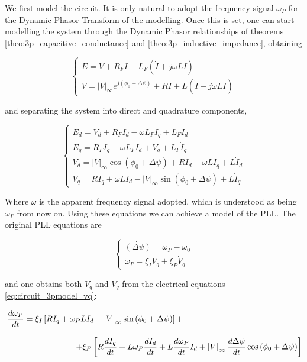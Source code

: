 \begin{example}
	We first model the circuit.  It is only natural to adopt the frequency signal $\omega_P$ for the Dynamic Phasor Transform of the modelling. Once this is set, one can start modelling the system through the Dynamic Phasor relationships of theorems \ref{theo:3p_capacitive_conductance} and \ref{theo:3p_inductive_impedance}, obtaining

\begin{equation} \left\{\begin{array}{l} E = V + R_F I + L_F\left(\dot{I} + j\omega L I\right) \\[3mm] V = \left|V\right|_\infty e^{j\left(\phi_0 + \Delta\psi\right)} + RI + L\left(\dot{I} + j\omega L I\right) \end{array}\right. \label{eq:circuit_3pmodel_complex} \end{equation}

	\noindent and separating the system into direct and quadrature components,

\begin{equation} \left\{\begin{array}{l}E_d = V_d + R_FI_d - \omega L_FI_q + L_F \dot{I}_d\\[2mm] E_q = R_FI_q + \omega L_FI_d + V_q + L_F \dot{I}_q\\[2mm] V_d = \left|V\right|_\infty\cos\left(\phi_0 + \Delta\psi\right) + RI_d - \omega L I_q + L \dot{I}_d \\[2mm] V_q = RI_q + \omega LI_d - \left|V\right|_\infty\sin\left(\phi_0 + \Delta\psi\right) +  L \dot{I}_q\end{array}\right. \label{eq:circuit_3pmodel_vq} \end{equation}

	Where $\omega$ is the apparent frequency signal adopted, which is understood as being $\omega_P$ from now on. Using these equations we can achieve a model of the PLL. The original PLL equations are

\begin{equation} \left\{\begin{array}{l} \dot{\left(\Delta\psi\right)} = \omega_P - \omega_0 \\[3mm] \dot{\omega}_P = \xi_IV_q + \xi_P\dot{V}_q \end{array}\right. \end{equation}

	\noindent and one obtains both $V_q$ and $\dot{V}_q$ from the electrical equations \eqref{eq:circuit_3pmodel_vq}:

\begin{gather}
	\hspace{-5cm} \dfrac{d\omega_P}{dt} = \xi_I\left[ RI_q + \omega_P L I_d - \left|V\right|_\infty\sin\left(\phi_0+\Delta\psi\right)\right] + \nonumber\\[3mm] \hspace{3cm} + \xi_P\left[  R \dfrac{dI_q}{dt} + L\omega_P \dfrac{dI_d}{dt} + L \dfrac{d\omega_P}{dt}I_d + \left|V\right|_\infty\dfrac{d\Delta\psi}{dt}\cos\left(\phi_0+\Delta\psi\right) \right]
\end{gather}


\end{example}
